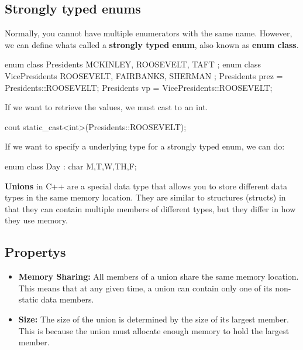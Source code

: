 \documentclass{report}
\begin{document}
    \bigbreak \noindent 
    \subsection{Strongly typed enums}
    \bigbreak \noindent 
    Normally, you cannot have multiple enumerators with the same name. However, we can define whats called a \textbf{strongly typed enum}, also known as \textbf{enum class}.
    \bigbreak \noindent 
    
    \begin{cppcode}
enum class Presidents { MCKINLEY, ROOSEVELT, TAFT }; 
enum class VicePresidents { ROOSEVELT, FAIRBANKS, SHERMAN };
Presidents prez = Presidents::ROOSEVELT;
Presidents vp = VicePresidents::ROOSEVELT;
    \end{cppcode}
    
    \bigbreak \noindent 
    If we want to retrieve the values, we must cast to an int.
    \bigbreak \noindent 
    
    \begin{cppcode}
cout static_cast<int>(Presidents::ROOSEVELT);
    \end{cppcode}
    
    \bigbreak \noindent 
    If we want to specify a underlying type for a strongly typed enum, we can do:
    \bigbreak \noindent 
    
    \begin{cppcode}
enum class Day : char {M,T,W,TH,F};
    \end{cppcode}

    \pagebreak 
    \bigbreak \noindent 
    \begin{concept}
        \textbf{Unions} in C++ are a special data type that allows you to store different data types in the same memory location. They are similar to structures (structs) in that they can contain multiple members of different types, but they differ in how they use memory. 
    \end{concept}

    \subsection{Propertys}
    \begin{itemize}
        \item \textbf{Memory Sharing:} All members of a union share the same memory location. This means that at any given time, a union can contain only one of its non-static data members.
        \item \textbf{Size:} The size of the union is determined by the size of its largest member. This is because the union must allocate enough memory to hold the largest member.
    \end{itemize}
\end{document}
